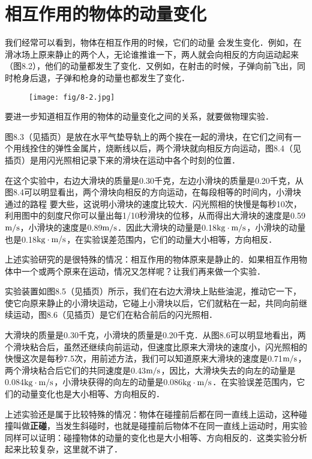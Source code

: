 \section{相互作用的物体的动量变化}
我们经常可以看到，物体在相互作用的时候，它们的动量
会发生变化．例如，在滑冰场上原来静止的两个人，无论谁推谁一下，两人就会向相反的方向运动起来（图8.2），他们的动量都发生了变化．又例如，在射击的时候，子弹向前飞出，同时枪身后退，子弹和枪身的动量也都发生了变化．
\begin{figure}[htp]\centering
\texttt{[image: fig/8-2.jpg]}
\caption{}
\end{figure}

要进一步知道相互作用的物体的动量变化之间的关系，就要做物理实验．

图8.3（见插页）是放在水平气垫导轨上的两个挨在一起的滑块，在它们之间有一个用线拴住的弹性金属片，烧断线以后，两个滑块就向相反方向运动，图8.4（见插页）是用闪光照相记录下来的滑块在运动中各个时刻的位置．

在这个实验中，右边大滑块的质量是0.30千克，左边小滑块的质量是0.20千克，从图8.4可以明显看出，两个滑块向相反的方向运动，在每段相等的时间内，小滑块通过的路程
要大些，这说明小滑块的速度比较大．闪光照相的快慢是每秒10次，利用图中的刻度尺你可以量出每1/10秒滑块的位移，从而得出大滑块的速度是0.59$\text{m}/\text{s}$，小滑块的速度是0.89$\text{m}/\text{s}$．因此大滑块的动量是0.18${\rm kg}\cdot \text{m}/\text{s}$，小滑块的动量也是0.18${\rm kg}\cdot \text{m}/\text{s}$，在实验误差范围内，它们的动量大小相等，方向相反．

上述实验研究的是很特殊的情况：相互作用的物体原来是静止的．如果相互作用物体中一个或两个原来在运动，情况又怎样呢？让我们再来做一个实验．

实验装置如图8.5（见插页）所示，我们在右边大滑块上贴些油泥，推动它一下，使它向原来静止的小滑块运动，它碰上小滑块以后，它们就粘在一起，共同向前继续运动，图8.6（见插页）是它们在粘合前后的闪光照相．

大滑块的质量是0.30千克，小滑块的质量是0.20千克．从图8.6可以明显地看出，两个滑块粘合后，虽然还继续向前运动，但速度比原来大滑块的速度小，闪光照相的快慢这次是每秒7.5次，用前述方法，我们可以知道原来大滑块的速度是0.71$\text{m}/\text{s}$，两个滑块粘合后它们的共同速度是0.43$\text{m}/\text{s}$，因比，大滑块失去的向左的动量是0.084${\rm kg}\cdot \text{m}/\text{s}$，小滑块获得的向左的动量是0.086${\rm kg}\cdot \text{m}/\text{s}$．在实验误差范围内，它们的动量变化也是大小相等、方向相反的．

上述实验还是属于比较特殊的情况：物体在碰撞前后都在同一直线上运动，这种碰撞叫做\textbf{正碰}，当发生斜碰时，也就是碰撞前后物体不在同一直线上运动时，用实验同样可以证明：碰撞物体的动量的变化也是大小相等、方向相反的．这类实验分析起来比较复杂，这里就不讲了．


